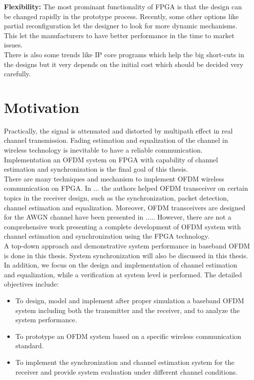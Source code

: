 \textbf{Flexibility:} The most prominant functionality of FPGA is that the design can be changed rapidly in the prototype process. Recently, some other options like partial reconfiguration let the designer to look for more dynamic mechanisms. This let the manufacturers to have better performance in the time to market issues.\\
There is also some trends like IP core programs which help the big short-cuts in the designs but it very depends on the initial cost which should be decided very carefully.


\section{Motivation}

Practically, the signal is attenuated and distorted by multipath effect in real channel transmission. Fading estimation and equalization of the channel in wireless technology is inevitable to have a reliable communication. Implementation an OFDM system on FPGA with capability of channel estimation and synchronization is the final goal of this thesis.\\
There are many techniques and mechanism to implement OFDM wireless communication on FPGA. In ... the authors helped OFDM transceiver on certain topics in the receiver design, such as the synchronization, packet detection, channel estimation and equalization. Moreover, OFDM transceivers are designed for the AWGN channel have been presented in ..... However, there are not a comprehensive work presenting a complete development of OFDM system with channel estimation and synchronization using the FPGA technology.\\

A top-down approach and demonstrative system performance in baseband OFDM is done in this thesis. System synchronization will also be discussed in this thesis. In addition, we focus on the design and implementation of channel estimation and equalization, while a verification at system level is performed. The detailed objectives include:\\

\begin{itemize}
\item To design, model and implement after proper simulation a baseband OFDM system including both the transmitter and the receiver, and to analyze the system performance.
\item To prototype an OFDM system based on a specific wireless communication standard.
\item To implement the synchronization and channel estimation system for the receiver and provide system evaluation under different channel conditions.
\end{itemize}


